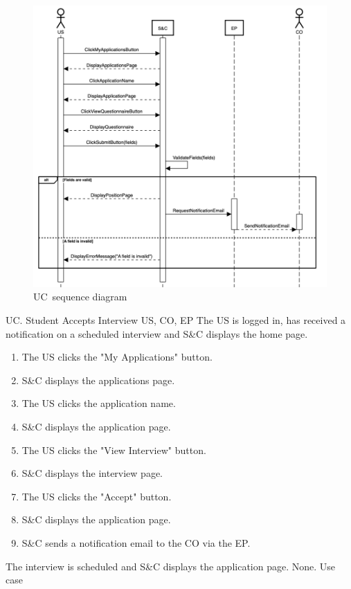 \begin{figure}
    \centering
    \includegraphics[width=16cm]{images/sequence-diagrams/student-fills-out-questionnaire.png}
    \caption{UC\theuc\ sequence diagram}
\end{figure}


\clearpage
\begin{usecase}
    {UC\theuc. Student Accepts Interview}
    {US, CO, EP}
    {The US is logged in, has received a notification on a scheduled interview and S\&C displays the home page.}
    {\begin{enumerate}[leftmargin=*]
        \item The US clicks the "My Applications" button.
        \item S\&C displays the applications page.
        \item The US clicks the application name.
        \item S\&C displays the application page.
        \item The US clicks the "View Interview" button.
        \item S\&C displays the interview page.
        \item The US clicks the "Accept" button.
        \item S\&C displays the application page.
        \item S\&C sends a notification email to the CO via the EP.
    \end{enumerate}}
    {The interview is scheduled and S\&C displays the application page.}
    {None.}
    {Use case \theuc}
\end{usecase}


